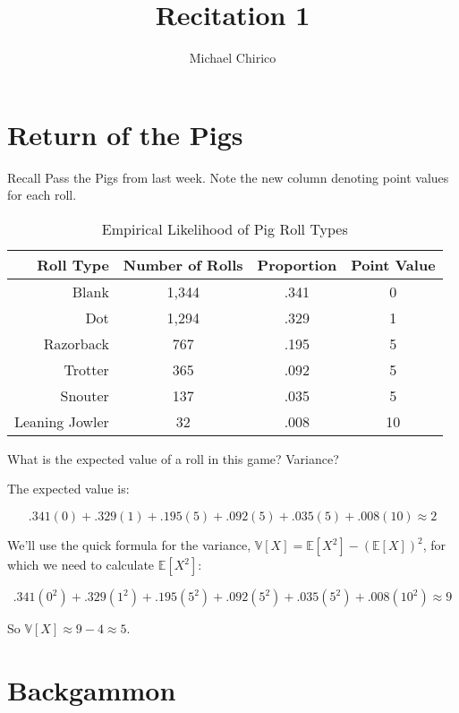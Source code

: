 \documentclass{article}
\begin{document}
\title{Recitation 1}
\author{Michael Chirico}

\maketitle

\section{Return of the Pigs}

Recall Pass the Pigs from last week. Note the new column denoting point values for each roll.

\begin{table}[htbp]
\centering
\begin{tabular}{|r|c|c|c|}
\hline
Roll Type & Number of Rolls & Proportion & Point Value \\
\hline
Blank & 1,344 & .341 & 0 \\
\hline
Dot & 1,294 & .329 & 1 \\
\hline
Razorback & 767 & .195 & 5 \\
\hline
Trotter & 365 & .092 & 5 \\
\hline
Snouter & 137 & .035 & 5 \\
\hline
Leaning Jowler & 32 & .008 & 10 \\
\hline
\end{tabular}
\caption{Empirical Likelihood of Pig Roll Types}
\label{tbl:pigout}
\end{table}

What is the expected value of a roll in this game? Variance?

\begin{solution}
The expected value is:

\[ .341(0) + .329(1) + .195(5) + .092(5) + .035(5) + .008(10) \approx  2\]

We'll use the quick formula for the variance, $\mathbb{V}[X] = \mathbb{E}[X^2] - \left( \mathbb{E}[X] \right)^2$, for which we need to calculate $\mathbb{E}[X^2]$:

\[ .341(0^2) + .329(1^2) + .195(5^2) + .092(5^2) + .035(5^2) + .008(10^2) \approx 9 \]

So $\mathbb{V}[X] \approx 9 - 4 \approx 5$.
\end{solution}

\section{Backgammon}
\end{document}

